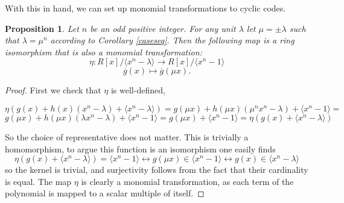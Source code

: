 \documentclass[a4paper, 12pt]{amsart}
\newtheorem{proposition}[lemma]{Proposition}
\theoremstyle{definition}
\newcommand{\id}[1]{\langle #1 \rangle}
\newcommand{\lm}{\lambda}
\numberwithin{equation}{section}
\numberwithin{table}{section}
\begin{document}
With this in hand, we can set up monomial transformations to cyclic codes.

\begin{proposition}\label{equivalencesR}
    Let $n$ be an odd positive integer. For any unit $\lm$ let $\mu = \pm \lm$ such that $\lm = \mu^n$ according to Corollary \ref{caseseq}. Then the following map is a ring isomorphism that is also a monomial transformation:
    \[\eta: R[x]/\langle x^n-\lm \rangle \to R[x]/\langle x^n- 1 \rangle\]
        \[\overline g(x) \mapsto \overline g(\mu x).\]
        

    
\end{proposition}

\begin{proof}
    First we check that $\eta$ is well-defined,

\[\eta(g(x) + h(x)(x^n-\lm) + \langle x^n - \lm \rangle) = g(\mu x) + h(\mu x)(\mu ^n x^{n}-\lm) + \langle x^n -1\rangle =\]
\[g(\mu x) + h(\mu x)(\lm x^n -\lm) + \langle x^n - 1 \rangle =
g(\mu x) + \langle x^n - 1 \rangle = \eta(g(x) + \langle x^n - \lm \rangle)\]

So the choice of representative does not matter.
This is trivially a homomorphism, to argue this function is an isomorphism one easily finds
\[\eta(g(x) + \id{x^n-\lm}) = \id{x^n-1} \leftrightarrow g(\mu x) \in \id{x^n-1} \leftrightarrow g(x) \in \id{x^n-\lm}\]
so the kernel is trivial, and surjectivity follows from the fact that their cardinality is equal.
The map $\eta$ is clearly a monomial transformation, as each term of the polynomial is mapped to a scalar multiple of itself.



\end{proof}
\end{document}
